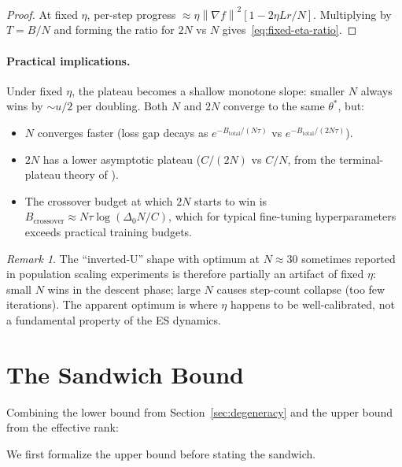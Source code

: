 \documentclass[11pt]{article}
\theoremstyle{definition}
\theoremstyle{remark}
\newtheorem{remark}{Remark}
\newcommand{\norm}[1]{\left\|#1\right\|}
\begin{document}
\begin{proof}
At fixed $\eta$, per-step progress $\approx \eta\norm{\nabla f}^2[1 - 2\eta Lr/N]$. Multiplying by $T = B/N$ and forming the ratio for $2N$ vs $N$ gives~\eqref{eq:fixed-eta-ratio}.
\end{proof}

\paragraph{Practical implications.}
Under fixed $\eta$, the plateau becomes a shallow monotone slope: smaller $N$ always wins by $\sim u/2$ per doubling. Both $N$ and $2N$ converge to the same $\theta^*$, but:
\begin{itemize}[leftmargin=*]
  \item $N$ converges faster (loss gap decays as $e^{-B_{\mathrm{total}}/(N\tau)}$ vs $e^{-B_{\mathrm{total}}/(2N\tau)}$).
  \item $2N$ has a lower asymptotic plateau ($C/(2N)$ vs $C/N$, from the terminal-plateau theory of \citet{liang2026blessing}).
  \item The crossover budget at which $2N$ starts to win is $B_{\mathrm{crossover}} \approx N\tau\log(\Delta_0 N/C)$, which for typical fine-tuning hyperparameters exceeds practical training budgets.
\end{itemize}

\begin{remark}
The ``inverted-U'' shape with optimum at $N \approx 30$ sometimes reported in population scaling experiments is therefore partially an artifact of fixed $\eta$: small $N$ wins in the descent phase; large $N$ causes step-count collapse (too few iterations). The apparent optimum is where $\eta$ happens to be well-calibrated, not a fundamental property of the ES dynamics.
\end{remark}

\section{The Sandwich Bound}
\label{sec:sandwich}

Combining the lower bound from Section~\ref{sec:degeneracy} and the upper bound from the effective rank:

We first formalize the upper bound before stating the sandwich.
\end{document}
